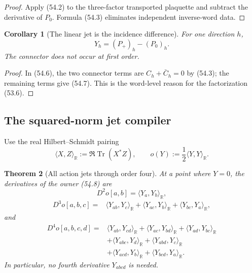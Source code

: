 \documentclass[11pt,oneside]{book}
\newtheorem{theorem}{Theorem}[chapter]
\newtheorem{corollary}[theorem]{Corollary}
\theoremstyle{definition}
\theoremstyle{remark}
\newcommand{\Tr}{\operatorname{Tr}}
\begin{document}
\begin{proof}
Apply (54.2) to the three-factor transported plaquette and subtract
the derivative of \(P_0\).  Formula (54.3) eliminates independent
inverse-word data.
\end{proof}

\begin{corollary}[The linear jet is the incidence difference]
\label{cor:e8v54-linear-jet}
For one direction \(h\),
\[
 Y_h=(P_+)_h-(P_0)_h.                                        \tag{54.7}
\]
The connector does not occur at first order.
\end{corollary}

\begin{proof}
In (54.6), the two connector terms are
\(C_h+\bar C_h=0\) by (54.3); the remaining terms give (54.7).
This is the word-level reason for the factorization (53.6).
\end{proof}

\subsection{The squared-norm jet compiler}

Use the real Hilbert--Schmidt pairing
\[
 \langle X,Z\rangle_{\mathbb R}:=\Re\Tr(X^*Z),\qquad
 o(Y):=\frac12\langle Y,Y\rangle_{\mathbb R}.                 \tag{54.8}
\]

\begin{theorem}[All action jets through order four]
\label{thm:e8v54-norm-jets}
At a point where \(Y=0\), the derivatives of the owner (54.8) are
\[
 D^2o[a,b]=\langle Y_a,Y_b\rangle_{\mathbb R},                \tag{54.9}
\]
\[
\begin{split}
 D^3o[a,b,c]={}&
 \langle Y_{ab},Y_c\rangle_{\mathbb R}
 +\langle Y_{ac},Y_b\rangle_{\mathbb R}
 +\langle Y_{bc},Y_a\rangle_{\mathbb R},                     \tag{54.10}
\end{split}
\]
and
\[
\begin{split}
 D^4o[a,b,c,d]={}&
 \langle Y_{ab},Y_{cd}\rangle_{\mathbb R}
 +\langle Y_{ac},Y_{bd}\rangle_{\mathbb R}
 +\langle Y_{ad},Y_{bc}\rangle_{\mathbb R}\\
 &+\langle Y_{abc},Y_d\rangle_{\mathbb R}
 +\langle Y_{abd},Y_c\rangle_{\mathbb R}\\
 &+\langle Y_{acd},Y_b\rangle_{\mathbb R}
 +\langle Y_{bcd},Y_a\rangle_{\mathbb R}.                    \tag{54.11}
\end{split}
\]
In particular, no fourth derivative \(Y_{abcd}\) is needed.
\end{theorem}
\end{document}
